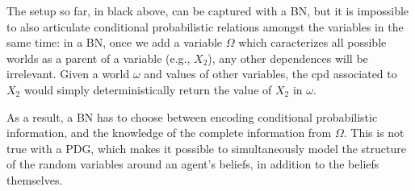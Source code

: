 \documentclass{article}
\theoremstyle{plain}
\theoremstyle{definition}
\newenvironment{example}
	{\pushQED{\qed}\renewcommand{\qedsymbol}{$\triangle$}\examplex}
	{\popQED\endexamplex%
}
\theoremstyle{remark}
\numberwithin{equation}{section}
\begin{document}
{\begin{example}
\begin{center}
{}
		\end{center}
		The setup so far, in black above, can be captured with a BN, but it is impossible to also articulate conditional probabilistic relations amongst the variables in the same time: in a BN, once we add a variable $\Omega$ which caracterizes all possible worlds as a parent of a variable (e.g., $X_2$), any other dependences will be irrelevant. Given a world $\omega$ and values of other variables, the cpd associated to $X_2$ would simply deterministically return the value of $X_2$ in $\omega$. 
		
		As a result, a BN has to choose between encoding conditional probabilistic information, and the knowledge of the complete information from $\Omega$. This is not true with a PDG, which makes it possible to simultaneously model the structure of the random variables around an agent's beliefs, in addition to the beliefs themselves.
	\end{example}

	
	\begin{vcat}

\end{vcat}}
\end{document}
